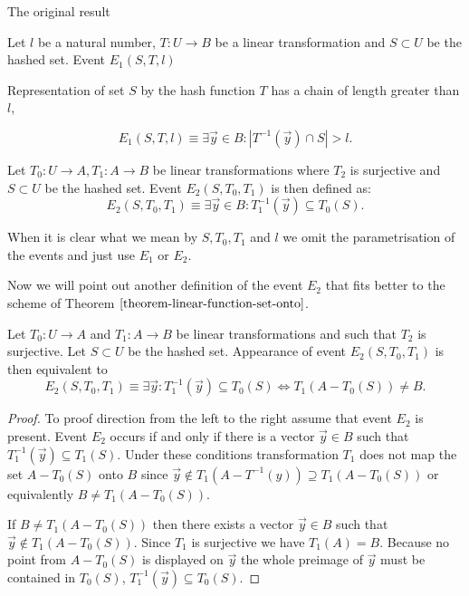 \begin{section}{The original result}
\begin{definition}
Let $l$ be a natural number, $T: U \rightarrow B$ be a linear transformation and $S \subset U$ be the hashed set. Event $E_1(S, T, l)$

\noindent Representation of set $S$ by the hash function $T$ has a chain of length greater than $l$,

\[ 
	E_1(S, T, l) \equiv \exists \vec{y} \in B: | T^{-1}(\vec{y}) \cap S | > l \text{.}
\]
\end{definition}

\begin{definition}
Let $T_0: U \rightarrow A, T_1: A \rightarrow B$ be linear transformations where $T_2$ is surjective and $S \subset U$ be the hashed set. Event $E_2(S, T_0, T_1)$ is then defined as:
\[
	E_2(S, T_0, T_1) \equiv \exists \vec{y} \in B: T_1^{-1}(\vec{y}) \subseteq T_0(S) \text{.}
\]
\end{definition}

When it is clear what we mean by $S, T_0, T_1$ and $l$ we omit the parametrisation of the events and just use $E_1$ or $E_2$.

Now we will point out another definition of the event $E_2$ that fits better to the scheme of Theorem $\ref{theorem-linear-function-set-onto}$.
\begin{remark}
\label{remark-e2-equivalency}
Let $T_0: U \rightarrow A$ and $T_1: A \rightarrow B$ be linear transformations and such that $T_2$ is surjective. Let $S \subset U$ be the hashed set. Appearance of event $E_2(S, T_0, T_1)$ is then equivalent to
\[
	E_2(S, T_0, T_1) \equiv \exists \vec{y}: T_1^{-1}(\vec{y}) \subseteq T_0(S) \Leftrightarrow T_1(A - T_0(S)) \neq B \text{.}
\]
\end{remark}
\begin{proof}
To proof direction from the left to the right assume that event $E_2$ is present. Event $E_2$ occurs if and only if there is a vector $\vec{y} \in B$ such that $T_1^{-1}(\vec{y}) \subseteq T_1(S)$. Under these conditions transformation $T_1$ does not map the set $A - T_0(S)$ onto $B$ since $\vec{y} \notin T_1(A - T^{-1}(y)) \supseteq T_1(A - T_0(S))$ or equivalently $B \neq T_1(A - T_0(S))$.

If $B \neq T_1(A - T_0(S))$ then there exists a vector $\vec{y} \in B$ such that $\vec{y} \notin T_1(A - T_0(S))$. Since $T_1$ is surjective we have $T_1(A) = B$. Because no point from $A - T_0(S)$ is displayed on $\vec{y}$ the whole preimage of $\vec{y}$ must be contained in $T_0(S)$, $T_1^{-1}(\vec{y}) \subseteq T_0(S)$.


\end{proof}
\end{section}
